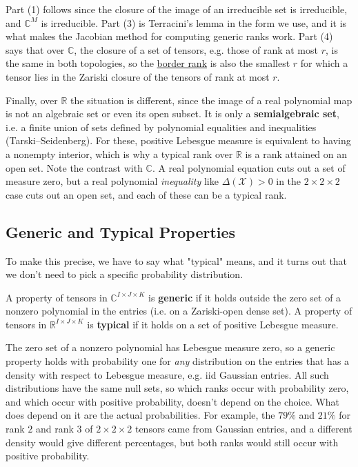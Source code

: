   Part (1) follows since the closure of the image of an irreducible set is irreducible, and $\mathbb{C}^M$ is irreducible. Part (3) is Terracini's lemma in the form we use, and it is what makes the Jacobian method for computing generic ranks work. Part (4) says that over $\mathbb{C}$, the closure of a set of tensors, e.g. those of rank at most $r$, is the same in both topologies, so the \hyperref[def:border-rank]{border rank} is also the smallest $r$ for which a tensor lies in the Zariski closure of the tensors of rank at most $r$. 

  Finally, over $\mathbb{R}$ the situation is different, since the image of a real polynomial map is not an algebraic set or even its open subset. It is only a \textbf{semialgebraic set}, i.e. a finite union of sets defined by polynomial equalities and inequalities (Tarski--Seidenberg). For these, positive Lebesgue measure is equivalent to having a nonempty interior, which is why a typical rank over $\mathbb{R}$ is a rank attained on an open set. Note the contrast with $\mathbb{C}$. A real polynomial equation cuts out a set of measure zero, but a real polynomial \textit{inequality} like $\Delta(\mathcal{X}) > 0$ in the $2 \times 2 \times 2$ case cuts out an open set, and each of these can be a typical rank. 

\subsection{Generic and Typical Properties}

  To make this precise, we have to say what "typical" means, and it turns out that we don't need to pick a specific probability distribution.

  \begin{definition}
    A property of tensors in $\mathbb{C}^{I \times J \times K}$ is \textbf{generic} if it holds outside the zero set of a nonzero polynomial in the entries (i.e. on a Zariski-open dense set). A property of tensors in $\mathbb{R}^{I \times J \times K}$ is \textbf{typical} if it holds on a set of positive Lebesgue measure.
  \end{definition}

  The zero set of a nonzero polynomial has Lebesgue measure zero, so a generic property holds with probability one for \textit{any} distribution on the entries that has a density with respect to Lebesgue measure, e.g. iid Gaussian entries. All such distributions have the same null sets, so which ranks occur with probability zero, and which occur with positive probability, doesn't depend on the choice. What does depend on it are the actual probabilities. For example, the $79\%$ and $21\%$ for rank $2$ and rank $3$ of $2 \times 2 \times 2$ tensors came from Gaussian entries, and a different density would give different percentages, but both ranks would still occur with positive probability.

